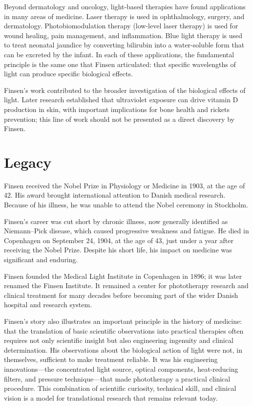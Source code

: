 Beyond dermatology and oncology, light-based therapies have found applications in many areas of medicine. Laser therapy is used in ophthalmology, surgery, and dermatology. Photobiomodulation therapy (low-level laser therapy) is used for wound healing, pain management, and inflammation. Blue light therapy is used to treat neonatal jaundice by converting bilirubin into a water-soluble form that can be excreted by the infant. In each of these applications, the fundamental principle is the same one that Finsen articulated: that specific wavelengths of light can produce specific biological effects.

Finsen's work contributed to the broader investigation of the biological effects of light. Later research established that ultraviolet exposure can drive vitamin D production in skin, with important implications for bone health and rickets prevention; this line of work should not be presented as a direct discovery by Finsen.

\section{Legacy}

Finsen received the Nobel Prize in Physiology or Medicine in 1903, at the age of 42. His award brought international attention to Danish medical research. Because of his illness, he was unable to attend the Nobel ceremony in Stockholm.\cite{finsen-facts}

Finsen's career was cut short by chronic illness, now generally identified as Niemann--Pick disease, which caused progressive weakness and fatigue. He died in Copenhagen on September 24, 1904, at the age of 43, just under a year after receiving the Nobel Prize. Despite his short life, his impact on medicine was significant and enduring.\cite{finsen-facts}

Finsen founded the Medical Light Institute in Copenhagen in 1896; it was later renamed the Finsen Institute. It remained a center for phototherapy research and clinical treatment for many decades before becoming part of the wider Danish hospital and research system.\cite{finsen-institute}

Finsen's story also illustrates an important principle in the history of medicine: that the translation of basic scientific observations into practical therapies often requires not only scientific insight but also engineering ingenuity and clinical determination. His observations about the biological action of light were not, in themselves, sufficient to make treatment reliable. It was his engineering innovations---the concentrated light source, optical components, heat-reducing filters, and pressure technique---that made phototherapy a practical clinical procedure. This combination of scientific curiosity, technical skill, and clinical vision is a model for translational research that remains relevant today.

